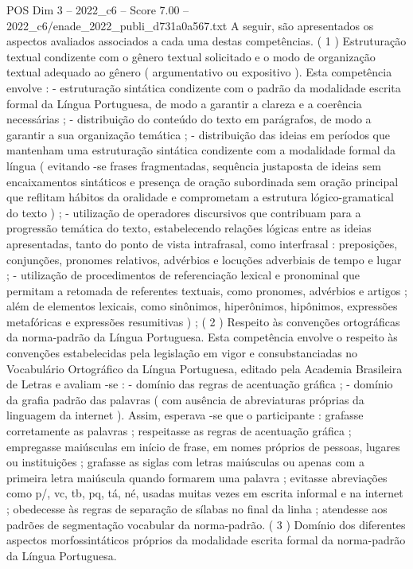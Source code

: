 \begin{textsample}{POS Dim 3 – 2022\_c6 – Score 7.00 – 2022\_c6/enade\_2022\_publi\_d731a0a567.txt}
A seguir, são apresentados os aspectos avaliados associados a cada uma destas competências. ( 1 ) Estruturação textual condizente com o gênero textual solicitado e o modo de organização textual adequado ao gênero ( argumentativo ou expositivo ).
Esta competência envolve : - estruturação sintática condizente com o padrão da modalidade escrita formal da Língua Portuguesa, de modo a garantir a clareza e a coerência necessárias ; - distribuição do conteúdo do texto em parágrafos, de modo a garantir a sua organização temática ; - distribuição das ideias em períodos que mantenham uma estruturação sintática condizente com a modalidade formal da língua ( evitando -se frases fragmentadas, sequência justaposta de ideias sem encaixamentos sintáticos e presença de oração subordinada sem oração principal que reflitam hábitos da oralidade e comprometam a estrutura lógico-gramatical do texto ) ; - utilização de operadores discursivos que contribuam para a progressão temática do texto, estabelecendo relações lógicas entre as ideias apresentadas, tanto do ponto de vista intrafrasal, como interfrasal : preposições, conjunções, pronomes relativos, advérbios e locuções adverbiais de tempo e lugar ; - utilização de procedimentos de referenciação lexical e pronominal que permitam a retomada de referentes textuais, como pronomes, advérbios e artigos ; além de elementos lexicais, como sinônimos, hiperônimos, hipônimos, expressões metafóricas e expressões resumitivas ) ; ( 2 ) Respeito às convenções ortográficas da norma-padrão da Língua Portuguesa.
Esta competência envolve o respeito às convenções estabelecidas pela legislação em vigor e consubstanciadas no Vocabulário Ortográfico da Língua Portuguesa, editado pela Academia Brasileira de Letras e avaliam -se : - domínio das regras de acentuação gráfica ; - domínio da grafia padrão das palavras ( com ausência de abreviaturas próprias da linguagem da internet ).
Assim, esperava -se que o participante : grafasse corretamente as palavras ; respeitasse as regras de acentuação gráfica ; empregasse maiúsculas em início de frase, em nomes próprios de pessoas, lugares ou instituições ; grafasse as siglas com letras maiúsculas ou apenas com a primeira letra maiúscula quando formarem uma palavra ; evitasse abreviações como p/, vc, tb, pq, tá, né, usadas muitas vezes em escrita informal e na internet ; obedecesse às regras de separação de sílabas no final da linha ; atendesse aos padrões de segmentação vocabular da norma-padrão. ( 3 ) Domínio dos diferentes aspectos morfossintáticos próprios da modalidade escrita formal da norma-padrão da Língua Portuguesa.

\end{textsample}
